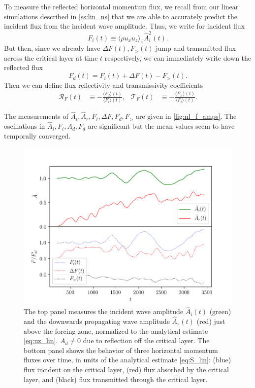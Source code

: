 \documentclass[
        fleqn,
        usenatbib,
    ]{mnras}
\newcommand*{\ev}[1]{\langle#1\rangle}
\begin{document}
To measure the reflected horizontal momentum flux, we recall from our linear
simulations described in \autoref{ss:lin_ns} that we are able to accurately
predict the incident flux from the incident wave amplitude. Thus, we write for
incident flux
\begin{equation}
    F_i(t) \equiv \ev{\rho u_{x} u_{z}}_x\hat{A}_i^2(t).
\end{equation}
But then, since we already have $\Delta F(t), F_>(t)$ jump and transmitted flux
across the critical layer at time $t$ respectively, we can immediately write
down the reflected flux
\begin{equation}
    F_d(t) = F_i(t) + \Delta F(t) - F_>(t).
\end{equation}
Then we can define flux reflectivity and transmissivity coefficients
\begin{align}
    \mathcal{R}_F(t) &\equiv -\frac{\ev{F_d}(t)}{\ev{F_i}(t)},&
    \mathcal{T}_F(t) &\equiv -\frac{\ev{F_>}(t)}{\ev{F_i}(t)}.
        \label{eq:srefl_def}
\end{align}

The measurements of $\hat{A}_i, \hat{A}_r, F_i, \Delta F, F_d, F_>$ are given in
\autoref{fig:nl_f_amps}. The oscillations in $\hat{A}_i, F_i, A_d, F_d$ are
significant but the mean values seem to have temporally converged.

\begin{figure}
    \centering
    \includegraphics[width=\columnwidth]{plots/nl_f_amps.png}
    \caption{The top panel measures the incident wave amplitude $\hat{A}_i(t)$
    (green) and the downwards propagating wave amplitude $\hat{A}_r(t)$ (red)
    just above the forcing zone, normalized to the analytical estimate
    \autoref{eq:uz_lin}. $A_d \neq 0$ due to reflection off the critical layer.
    The bottom panel shows the behavior of three horizontal momentum fluxes over
    time, in units of the analytical estimate \autoref{eq:S_lin}: (blue) flux
    incident on the critical layer, (red) flux absorbed by the critical layer,
    and (black) flux transmitted through the critical
    layer.}\label{fig:nl_f_amps}
\end{figure}
\end{document}
